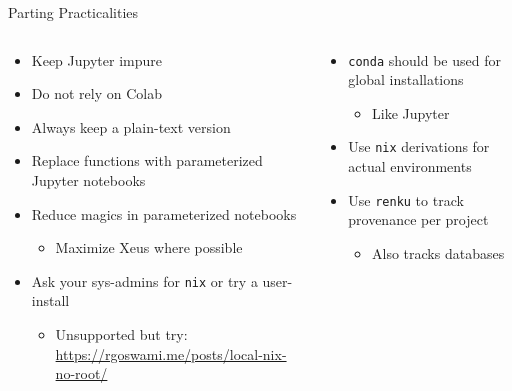 \documentclass[bigger,unknownkeysallowed,aspectratio=169,red,colorblocks]{beamer}
\begin{document}
\begin{frame}[label={sec:org4907004},fragile]{Parting Practicalities}
 \begin{columns}
\begin{column}{0.6\columnwidth}
\begin{itemize}
\item Keep Jupyter \alert{impure}
\item Do \alert{not} rely on Colab
\item Always keep a plain-text version
\item Replace \alert{functions} with parameterized Jupyter notebooks
\item Reduce magics in parameterized notebooks
\begin{itemize}
\item Maximize Xeus where possible
\end{itemize}
\item Ask your sys-admins for \texttt{nix} or try a user-install
\begin{itemize}
\item Unsupported but try: \url{https://rgoswami.me/posts/local-nix-no-root/}
\end{itemize}
\end{itemize}
\end{column}
\begin{column}{0.4\columnwidth}
\begin{itemize}
\item \texttt{conda} should be used for \alert{global} installations
\begin{itemize}
\item Like Jupyter
\end{itemize}
\item Use \texttt{nix} derivations for actual environments
\item Use \texttt{renku} to track provenance per project
\begin{itemize}
\item Also tracks databases
\end{itemize}
\end{itemize}
\end{column}
\end{columns}
\end{frame}
\end{document}

